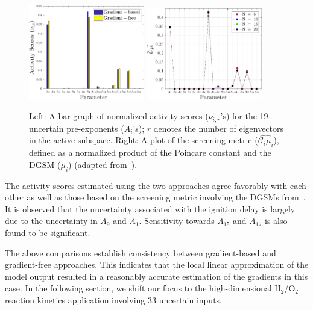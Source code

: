 %
\begin{figure}[htbp]
 \begin{center}
  \includegraphics[width=0.45\textwidth]{./Figures/comp_as}
  \includegraphics[width=0.45\textwidth]{./Figures/ub_conv_kinetics_rich}
\caption{Left: A bar-graph of normalized activity scores ($\tilde{\nu_{i,r}}$'s) for the 19 uncertain pre-exponents ($A_i$'s); $r$
denotes the number of eigenvectors in the active subspace.
Right: A plot of the screening metric ($\widehat{\mathcal{C}_i\mu_i}$), defined as a normalized product of the
Poincare constant and the DGSM ($\mu_i$) (adapted from~\cite{Vohra:2018}).}
\label{fig:comp_as}
\end{center}
\end{figure}
%
The activity scores estimated using the two approaches agree favorably with each other as well as those
based on the screening metric involving the DGSMs from~\cite{Vohra:2018}. It is observed that the uncertainty
associated with the ignition delay is largely due to the uncertainty in $A_9$ and $A_1$. Sensitivity towards
$A_{15}$ and $A_{17}$ is also found to be significant. 

The above comparisons establish consistency between gradient-based and
gradient-free approaches. This indicates that the local linear approximation
of the model output resulted in a reasonably accurate estimation of the
gradients in this case. In the following section, we shift our focus to 
the high-dimensional H$_2$/O$_2$ reaction kinetics application involving
33 uncertain inputs. 
